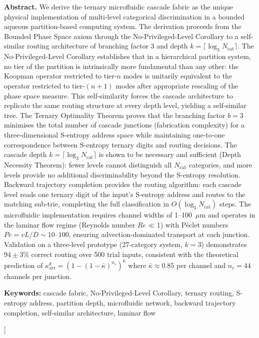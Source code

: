 \documentclass[11pt,twocolumn,a4paper]{article}
\theoremstyle{remark}
\newcommand{\kap}{\kappa}
\begin{document}
\begin{@twocolumnfalse}
\begin{center}
\begin{minipage}{0.92\textwidth}
\textbf{Abstract.}
We derive the ternary microfluidic cascade fabric as the unique physical
implementation of multi-level categorical discrimination in a bounded
aqueous partition-based computing system. The derivation proceeds from the
Bounded Phase Space axiom through the No-Privileged-Level Corollary to a
self-similar routing architecture of branching factor 3 and depth
$k = \lceil\log_3 N_{\mathrm{cat}}\rceil$. The No-Privileged-Level Corollary
establishes that in a hierarchical partition system, no tier of the partition
is intrinsically more fundamental than any other: the Koopman operator restricted
to tier-$n$ modes is unitarily equivalent to the operator restricted to tier-$(n+1)$
modes after appropriate rescaling of the phase space measure. This self-similarity
forces the cascade architecture to replicate the same routing structure at every
depth level, yielding a self-similar tree. The Ternary Optimality Theorem proves
that the branching factor $b = 3$ minimises the total number of cascade junctions
(fabrication complexity) for a three-dimensional S-entropy address space while
maintaining one-to-one correspondence between S-entropy ternary digits and routing
decisions. The cascade depth $k = \lceil\log_3 N_{\mathrm{cat}}\rceil$ is shown
to be necessary and sufficient (Depth Necessity Theorem): fewer levels cannot
distinguish all $N_{\mathrm{cat}}$ categories, and more levels provide no
additional discriminability beyond the S-entropy resolution. Backward trajectory
completion provides the routing algorithm: each cascade level reads one ternary
digit of the input's S-entropy address and routes to the matching sub-trie,
completing the full classification in $O(\log_3 N_{\mathrm{cat}})$ steps.
The microfluidic implementation requires channel widths of 1--100~$\mu$m and
operates in the laminar flow regime (Reynolds number $Re \ll 1$) with Péclet
numbers $Pe = vL/D \sim 10$--$100$, ensuring advection-dominated transport
at each junction. Validation on a three-level prototype (27-category system,
$k=3$) demonstrates $94\pm 3\%$ correct routing over 500 trial inputs,
consistent with the theoretical prediction of $\kap_{\mathrm{arr}}^k = (1 -
(1-\bar{\kap})^{n_c})^k$ where $\bar{\kap} \approx 0.85$ per channel and
$n_c = 44$ channels per junction.
\end{minipage}

\vspace{8pt}
\noindent\textbf{Keywords:}
cascade fabric, No-Privileged-Level Corollary, ternary routing, S-entropy address,
partition depth, microfluidic network, backward trajectory completion,
self-similar architecture, laminar flow

\vspace{18pt}
\end{center}
\end{@twocolumnfalse}
]
\end{document}

